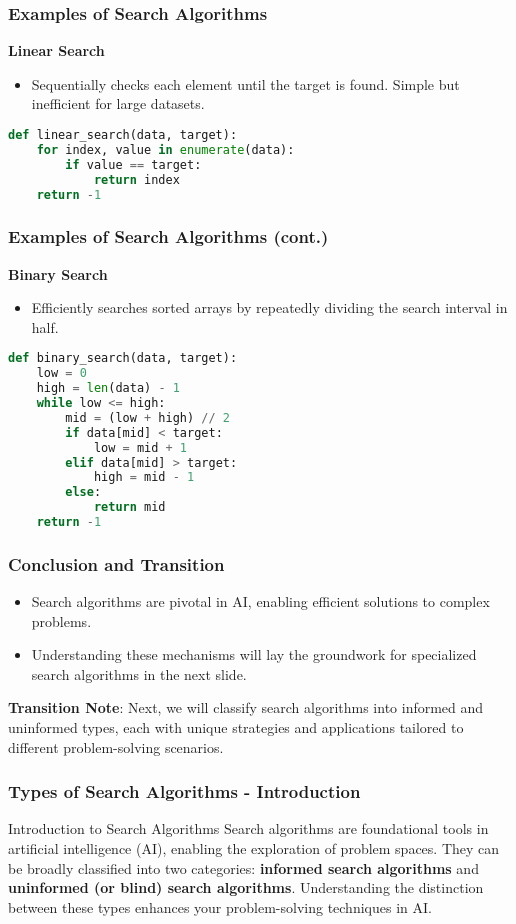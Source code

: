 \documentclass[aspectratio=169]{beamer}
\begin{document}
\begin{frame}[fragile]
    \frametitle{Examples of Search Algorithms}
    \textbf{Linear Search}
    \begin{itemize}
        \item Sequentially checks each element until the target is found. Simple but inefficient for large datasets.
    \end{itemize}
    \begin{lstlisting}[language=Python]
def linear_search(data, target):
    for index, value in enumerate(data):
        if value == target:
            return index
    return -1
    \end{lstlisting}
\end{frame}

\begin{frame}[fragile]
    \frametitle{Examples of Search Algorithms (cont.)}
    \textbf{Binary Search}
    \begin{itemize}
        \item Efficiently searches sorted arrays by repeatedly dividing the search interval in half.
    \end{itemize}
    \begin{lstlisting}[language=Python]
def binary_search(data, target):
    low = 0
    high = len(data) - 1
    while low <= high:
        mid = (low + high) // 2
        if data[mid] < target:
            low = mid + 1
        elif data[mid] > target:
            high = mid - 1
        else:
            return mid
    return -1
    \end{lstlisting}
\end{frame}

\begin{frame}[fragile]
    \frametitle{Conclusion and Transition}
    \begin{itemize}
        \item Search algorithms are pivotal in AI, enabling efficient solutions to complex problems.
        \item Understanding these mechanisms will lay the groundwork for specialized search algorithms in the next slide.
    \end{itemize}
    \textbf{Transition Note}: Next, we will classify search algorithms into informed and uninformed types, each with unique strategies and applications tailored to different problem-solving scenarios.
\end{frame}

\begin{frame}[fragile]
    \frametitle{Types of Search Algorithms - Introduction}
    \begin{block}{Introduction to Search Algorithms}
        Search algorithms are foundational tools in artificial intelligence (AI), enabling the exploration of problem spaces. 
        They can be broadly classified into two categories: 
        \textbf{informed search algorithms} and \textbf{uninformed (or blind) search algorithms}. 
        Understanding the distinction between these types enhances your problem-solving techniques in AI.
    \end{block}
\end{frame}
\end{document}
